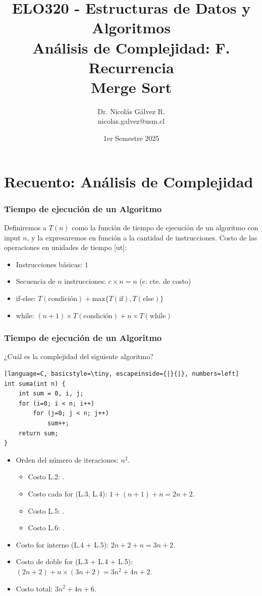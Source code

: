 \documentclass{beamer}
\title{ELO320 - Estructuras de Datos y Algoritmos\\Análisis de Complejidad: F. Recurrencia\\\small{Merge Sort}}
\author{Dr. Nicolás Gálvez R.\\{\small nicolas.galvez@usm.cl}}
\institute{Ing. Civil Telemática - Departamento de Electrónica}
\date{1er Semestre 2025}
\begin{document}
\frame{\titlepage}

%
%

\section{Recuento: Análisis de Complejidad}
\begin{frame}[fragile]
 \frametitle{Tiempo de ejecución de un Algoritmo}
\small Definiremos a $T(n)$ como la función de tiempo de ejecución de un algoritmo con input $n$, y la expresaremos en función a la cantidad de instrucciones.
\bigskip
Costo de las operaciones en unidades de tiempo [ut]:
\begin{itemize}
\item Instrucciones básicas: $1$
\item Secuencia de $n$ instrucciones:  $c \times n = n$ (c: cte. de costo)
\item if-else: $T(\text{condición}) + \text{max}\{T(\text{if}), T(\text{else})\}$
\item while: $(n+1) \times T(\text{condición}) + n \times T(\text{while}) $
\end{itemize}
\end{frame}


\begin{frame}[fragile]
 \frametitle{Tiempo de ejecución de un Algoritmo}
\begin{exampleblock}{¿Cuál es la complejidad del siguiente algoritmo?}
\begin{lstlisting}[language=C, basicstyle=\tiny, escapeinside={|}{|}, numbers=left]
int suma(int n) {
	int sum = 0, i, j;
	for (i=0; i < n; i++) 
		for (j=0; j < n; j++)
			sum++;
	return sum;
}
\end{lstlisting}
\end{exampleblock}
\pause
\begin{itemize}
\item Orden del número de iteraciones: $n^2$. \pause
\begin{itemize}
\item Costo L.2: . \pause 
\item Costo cada for (L.3, L.4): \pause $1+(n+1)+n = 2n+2$. \pause
\item Costo L.5: . \pause
\item Costo L.6: . \pause
\end{itemize}
\item Costo for interno (L.4 + L.5):  \pause $2n+2+n = 3n+2$. \pause
\item Costo de doble for (L.3 + L.4 + L.5): \pause $(2n+2) + n \times (3n+2) = 3n^2 + 4n + 2$. \pause
\item Costo total: \pause $3n^2 + 4n + 6$. \pause
\end{itemize}

\end{frame}
\end{document}
